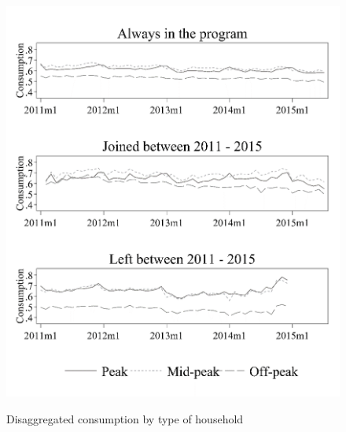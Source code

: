 \begin{figure}[ht]
  \caption{Disaggregated consumption by type of household}\label{fig:seventeen}
  \begin{center}
  {\includegraphics[width=1\textwidth]{./figures/image17.png}}
  \end{center}
\end{figure}

\FloatBarrier

